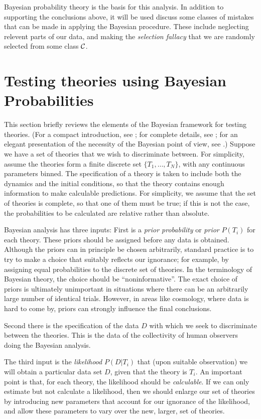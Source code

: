 \documentclass[pra,floatfix,preprint,nofootinbib,12pt]{revtex4}
\begin{document}
Bayesian probability theory is the basis for this analysis.  
In addition to supporting the conclusions above, it will be used  discuss some classes of mistakes that can be made in applying the Bayesian procedure. These include neglecting relevent parts of our data, and making the {\em selection fallacy} that we are randomly selected from some class $\cal C$. 

\section{Testing theories using Bayesian Probabilities}

This section briefly reviews the elements of the Bayesian framework for testing theories. 
(For a compact introduction,
see \cite{Sred05}; for complete details, see \cite{Jaynes}; for an elegant presentation of the 
necessity of the Bayesian point of view, see \cite{App04}.)  Suppose we have a set of theories that we wish to discriminate between.  For simplicity, assume the theories  form a finite discrete set
$\{T_1,  \ldots, T_N\}$, with any continuous parameters binned.   The specification of a theory is taken to include both the dynamics and the initial conditions, so that the theory contains enough information to make calculable predictions.   For simplicity, we assume that the set of theories
is complete, so that one of them must be true; if this is not the case,
the probabilities to be calculated are relative rather than absolute.  

Bayesian analysis has three inputs:  First is a {\it prior probability\/} or {\it prior\/}
$P(T_i)$ for each theory.  These priors should be assigned before any data is obtained.  
Although the priors can in principle be chosen arbitrarily, standard practice is to try to make 
a choice that  suitably reflects our ignorance; for example, by assigning equal probabilities to the discrete set of theories. In the terminology of Bayesian theory, the choice should be ``noninformative''.  
The exact choice of priors is ultimately unimportant in situations where there can be an arbitrarily large number of identical trials. However, in areas like cosmology, where data is hard to come by, priors can strongly influence the final conclusions.  

Second there  is the specification of the data $D$ with which we seek to discriminate between the theories. This is the data of the collectivity of human observers doing the Bayesian analysis. 

The third input  is the {\it likelihood\/} $P(D|T_i)$ that (upon suitable observation) we will
obtain a particular data set $D$, given that the theory is $T_i$.  
An important point is that, for each theory, the likelihood
should be {\it calculable}.  If we can only estimate but not calculate a likelihood, then we should enlarge our set of theories by introducing new parameters that account for our ignorance of the
likelihood, and allow these parameters to vary over the new, larger, set of theories.  
\end{document}
